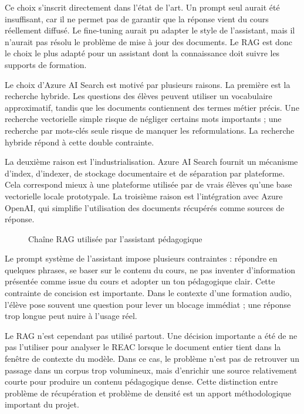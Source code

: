 \documentclass[12pt,a4paper]{article}
\begin{document}
Ce choix s'inscrit directement dans l'état de l'art. Un prompt seul aurait été insuffisant,
car il ne permet pas de garantir que la réponse vient du cours réellement diffusé. Le
fine-tuning aurait pu adapter le style de l'assistant, mais il n'aurait pas résolu le problème
de mise à jour des documents. Le RAG est donc le choix le plus adapté pour un assistant
dont la connaissance doit suivre les supports de formation.

Le choix d'Azure AI Search est motivé par plusieurs raisons. La première est la recherche
hybride. Les questions des élèves peuvent utiliser un vocabulaire approximatif, tandis que
les documents contiennent des termes métier précis. Une recherche vectorielle simple
risque de négliger certains mots importants ; une recherche par mots-clés seule risque de
manquer les reformulations. La recherche hybride répond à cette double contrainte.

La deuxième raison est l'industrialisation. Azure AI Search fournit un mécanisme d'index,
d'indexer, de stockage documentaire et de séparation par plateforme. Cela correspond
mieux à une plateforme utilisée par de vrais élèves qu'une base vectorielle locale
prototypale. La troisième raison est l'intégration avec Azure OpenAI, qui simplifie
l'utilisation des documents récupérés comme sources de réponse.

\begin{figure}[h]
\centering
{}
\caption{Chaîne RAG utilisée par l'assistant pédagogique}
\end{figure}

Le prompt système de l'assistant impose plusieurs contraintes : répondre en quelques
phrases, se baser sur le contenu du cours, ne pas inventer d'information présentée comme
issue du cours et adopter un ton pédagogique clair. Cette contrainte de concision est
importante. Dans le contexte d'une formation audio, l'élève pose souvent une question
pour lever un blocage immédiat ; une réponse trop longue peut nuire à l'usage réel.

Le RAG n'est cependant pas utilisé partout. Une décision importante a été de ne pas
l'utiliser pour analyser le REAC lorsque le document entier tient dans la fenêtre de
contexte du modèle. Dans ce cas, le problème n'est pas de retrouver un passage dans un
corpus trop volumineux, mais d'enrichir une source relativement courte pour produire un
contenu pédagogique dense. Cette distinction entre problème de récupération et problème
de densité est un apport méthodologique important du projet.
\end{document}
